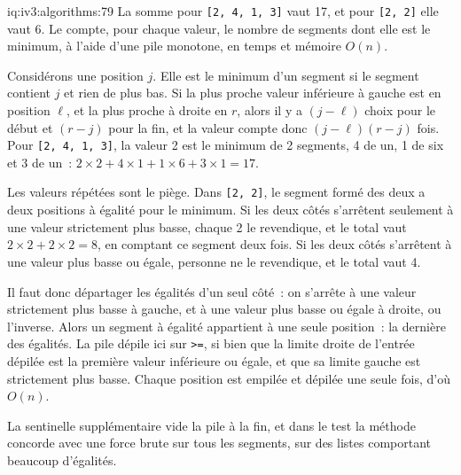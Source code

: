 \begin{solution}{iq:iv3:algorithms:79}
La somme pour \texttt{[2, 4, 1, 3]} vaut 17, et pour \texttt{[2, 2]} elle vaut 6. Le  compte, pour chaque valeur, le nombre de segments dont elle est le minimum, à l'aide d'une pile monotone, en temps et mémoire $O(n)$.
\label{lst:iv3:al:summins}

Considérons une position $j$. Elle est le minimum d'un segment si le segment contient $j$ et rien de plus bas. Si la plus proche valeur inférieure à gauche est en position $\ell$, et la plus proche à droite en $r$, alors il y a $(j - \ell)$ choix pour le début et $(r - j)$ pour la fin, et la valeur compte donc $(j - \ell)(r - j)$ fois. Pour \texttt{[2, 4, 1, 3]}, la valeur 2 est le minimum de 2 segments, 4 de un, 1 de six et 3 de un~: $2 \times 2 + 4 \times 1 + 1 \times 6 + 3 \times 1 = 17$.

Les valeurs répétées sont le piège. Dans \texttt{[2, 2]}, le segment formé des deux a deux positions à égalité pour le minimum. Si les deux côtés s'arrêtent seulement à une valeur strictement plus basse, chaque 2 le revendique, et le total vaut $2 \times 2 + 2 \times 2 = 8$, en comptant ce segment deux fois. Si les deux côtés s'arrêtent à une valeur plus basse ou égale, personne ne le revendique, et le total vaut 4.

Il faut donc départager les égalités d'un seul côté~: on s'arrête à une valeur strictement plus basse à gauche, et à une valeur plus basse ou égale à droite, ou l'inverse. Alors un segment à égalité appartient à une seule position~: la dernière des égalités. La pile dépile ici sur \texttt{>=}, si bien que la limite droite de l'entrée dépilée est la première valeur inférieure ou égale, et que sa limite gauche est strictement plus basse. Chaque position est empilée et dépilée une seule fois, d'où $O(n)$.

La sentinelle supplémentaire vide la pile à la fin, et dans le test la méthode concorde avec une force brute sur tous les segments, sur des listes comportant beaucoup d'égalités.

\end{solution}


